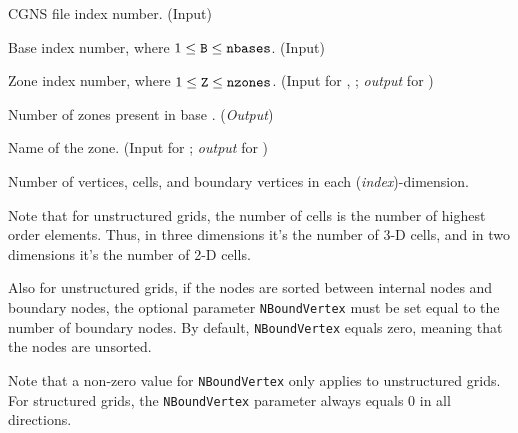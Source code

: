 \begin{Ventryi}{}\raggedright
\item [\fort{fn}]
      CGNS file index number.
      (\textcolor{input}{Input})
\item [\fort{B}]
      Base index number, where $1 \leq \text{{\normalfont\texttt{B}}} \leq \text{{\normalfont\texttt{nbases}}}$.
      (\textcolor{input}{Input})
\item [\fort{Z}]
      Zone index number, where $1 \leq \text{{\normalfont\texttt{Z}}} \leq \text{{\normalfont\texttt{nzones}}}$.
      (\textcolor{input}{Input} for ,
      ; \textcolor{output}{\textit{output}} for
      )
\item [\fort{nzones}]
      Number of zones present in base .
      (\textcolor{output}{\textit{Output}})
\item [\fort{zonename}]
      Name of the zone.
      (\textcolor{input}{Input} for ;
      \textcolor{output}{\textit{output}} for )
\item [\fort{size}]
      Number of vertices, cells, and boundary vertices in each
      (\textit{index})-dimension.

      Note that for unstructured grids, the number of cells is the
      number of highest order elements.
      Thus, in three dimensions it's the number of 3-D cells, and in
      two dimensions it's the number of 2-D cells.

      Also for unstructured grids, if the nodes are sorted between
      internal nodes and boundary nodes, the optional parameter
      \texttt{NBoundVertex} must be set equal to the number of boundary
      nodes.
      By default, \texttt{NBoundVertex} equals zero, meaning that the
      nodes are unsorted.

      Note that a non-zero value for \texttt{NBoundVertex} only applies
      to unstructured grids.
      For structured grids, the \texttt{NBoundVertex} parameter always
      equals 0 in all directions.


\end{Ventryi}
